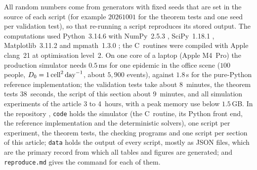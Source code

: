 All random numbers come from generators with fixed seeds that are set in the source of each script (for
example $20261001$ for the theorem tests and one seed per validation test), so that re-running a script
reproduces its stored output.
The computations used Python~3.14.6 with NumPy~2.5.3 \citep{harris2020array}, SciPy~1.18.1
\citep{virtanen2020scipy}, Matplotlib~3.11.2 \citep{hunter2007matplotlib} and mpmath~1.3.0
\citep{mpmath2023}; the C~routines were compiled with Apple clang~21 at optimisation level~2.
On one core of a laptop (Apple M4~Pro) the production simulator needs $0.5$\,ms for one epidemic in the
office scene ($100$ people, $D_0=1\,\mathrm{cell}^2\,\mathrm{day}^{-1}$, about $5{,}900$ events), against $1.8$\,s for the pure-Python
reference implementation; the validation tests take about 8~minutes, the theorem tests 38~seconds, the script
of this section about 9~minutes, and all simulation experiments of the article 3 to 4~hours, with a peak
memory use below $1.5$\,GB.
In the repository \citep{zhouyi2026code}, \texttt{code} holds the simulator (the C~routine, its Python front
end, the reference implementation and the deterministic solvers), one script per experiment, the theorem
tests, the checking programs and one script per section of this article; \texttt{data} holds the output of
every script, mostly as JSON files, which are the primary record from which all tables and figures are
generated; and \texttt{reproduce.md} gives the command for each of them.
